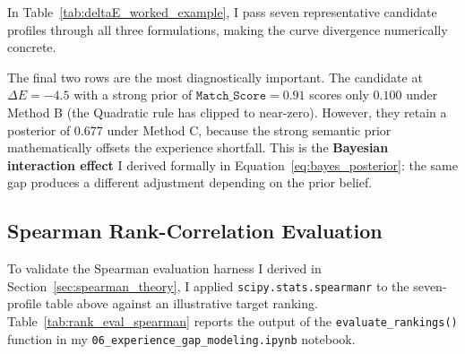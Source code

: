 In Table~\ref{tab:deltaE_worked_example}, I pass seven representative candidate profiles through all three formulations, making the curve divergence numerically concrete.

\begin{table}[htbp]
    \centering
    \caption{Adjusted Competency Score under all three $\Delta E$ formulations for representative candidate profiles.}
    \label{tab:deltaE_worked_example}
\end{table}

The final two rows are the most diagnostically important. The candidate at $\Delta E = -4.5$ with a strong prior of $\texttt{Match\_Score} = 0.91$ scores only $0.100$ under Method B (the Quadratic rule has clipped to near-zero). However, they retain a posterior of $0.677$ under Method C, because the strong semantic prior mathematically offsets the experience shortfall. This is the \textbf{Bayesian interaction effect} I derived formally in Equation~\eqref{eq:bayes_posterior}: the same gap produces a different adjustment depending on the prior belief.

\subsection{Spearman Rank-Correlation Evaluation}
\label{sec:rank_eval_example}

To validate the Spearman evaluation harness I derived in Section~\ref{sec:spearman_theory}, I applied \texttt{scipy.stats.spearmanr} to the seven-profile table above against an illustrative target ranking. Table~\ref{tab:rank_eval_spearman} reports the output of the \texttt{evaluate\_rankings()} function in my \texttt{06\_experience\_gap\_modeling.ipynb} notebook.

